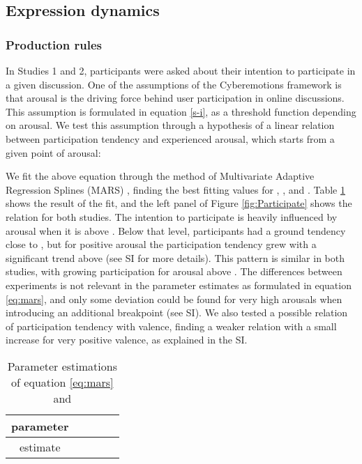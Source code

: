 \documentclass[nologo,url,11pt,a4paper]{ETHpaper}
\begin{document}
\subsection{Expression dynamics}




\subsubsection{Production rules}

In Studies 1 and 2, participants were asked about their intention to
participate in a given discussion. One of the assumptions of the Cyberemotions
framework is that arousal is the driving force behind user participation in
online discussions.  This assumption is formulated in equation \ref{s-i}, as a
threshold function depending on arousal. We test this assumption through a
hypothesis of a  linear relation between participation tendency and
experienced arousal, which starts from a given point of arousal:

We fit the above equation through  the method of Multivariate Adaptive
Regression Splines (MARS) \cite{Friedman1991}, finding  the best fitting
values for  , , and . Table \ref{tab:Amars} shows the
result of the fit, and the left panel of  Figure \ref{fig:Participate} shows
the relation for both studies.  The intention to participate is heavily
influenced by arousal when it is above . Below that level, participants had
a ground tendency  close to , but for positive arousal the participation
tendency grew with a significant trend above  (see SI for more details).
This pattern is similar in both studies, with growing participation for
arousal above . The differences between experiments is not relevant in the
parameter estimates as  formulated in equation \ref{eq:mars}, and only some
deviation could be found for very high arousals when introducing an additional
breakpoint (see SI). We also tested a possible relation of participation
tendency with valence, finding a weaker relation with a small increase for
very positive valence, as explained in the SI.

\begin{table}[h]
\centering
\begin{tabular}{ c | c  c  c  | c }
parameter &    &   &  &  \\ \hline
estimate  &  &    &     & 
\end{tabular}
\caption[Participation MARS results]{Parameter estimations of equation \ref{eq:mars} and 
\label{tab:Amars}}
\end{table}
\end{document}
